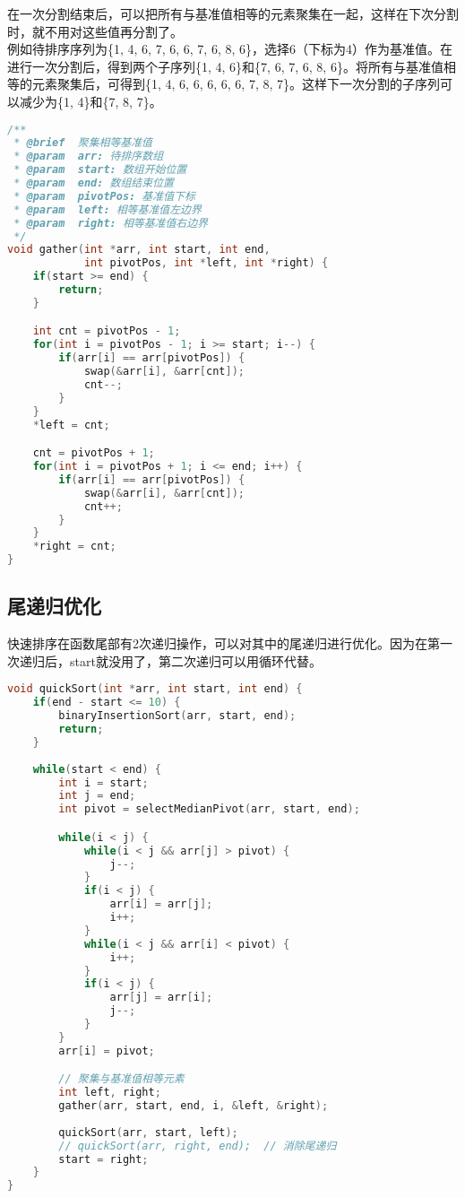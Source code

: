 在一次分割结束后，可以把所有与基准值相等的元素聚集在一起，这样在下次分割时，就不用对这些值再分割了。 \\

例如待排序序列为\{1, 4, 6, 7, 6, 6, 7, 6, 8, 6\}，选择6（下标为4）作为基准值。在进行一次分割后，得到两个子序列\{1, 4, 6\}和\{7, 6, 7, 6, 8, 6\}。将所有与基准值相等的元素聚集后，可得到\{1, 4, 6, 6, 6, 6, 6, 7, 8, 7\}。这样下一次分割的子序列可以减少为\{1, 4\}和\{7, 8, 7\}。 \\


\begin{lstlisting}[language=C]
/**
 * @brief  聚集相等基准值
 * @param  arr: 待排序数组
 * @param  start: 数组开始位置
 * @param  end: 数组结束位置
 * @param  pivotPos: 基准值下标
 * @param  left: 相等基准值左边界
 * @param  right: 相等基准值右边界
 */
void gather(int *arr, int start, int end, 
            int pivotPos, int *left, int *right) {
    if(start >= end) {
        return;
    }

    int cnt = pivotPos - 1;
    for(int i = pivotPos - 1; i >= start; i--) {
        if(arr[i] == arr[pivotPos]) {
            swap(&arr[i], &arr[cnt]);
            cnt--;
        }
    }
    *left = cnt;

    cnt = pivotPos + 1;
    for(int i = pivotPos + 1; i <= end; i++) {
        if(arr[i] == arr[pivotPos]) {
            swap(&arr[i], &arr[cnt]);
            cnt++;
        }
    }
    *right = cnt;
}
\end{lstlisting}

\subsection{尾递归优化}

快速排序在函数尾部有2次递归操作，可以对其中的尾递归进行优化。因为在第一次递归后，start就没用了，第二次递归可以用循环代替。 \\


\begin{lstlisting}[language=C]
void quickSort(int *arr, int start, int end) {
    if(end - start <= 10) {
        binaryInsertionSort(arr, start, end);
        return;
    }
    
    while(start < end) {
        int i = start;
        int j = end;
        int pivot = selectMedianPivot(arr, start, end);

        while(i < j) {
            while(i < j && arr[j] > pivot) {
                j--;
            }
            if(i < j) {
                arr[i] = arr[j];
                i++;
            }
            while(i < j && arr[i] < pivot) {
                i++;
            }
            if(i < j) {
                arr[j] = arr[i];
                j--;
            }
        }
        arr[i] = pivot;

        // 聚集与基准值相等元素
        int left, right;
        gather(arr, start, end, i, &left, &right);
        
        quickSort(arr, start, left);
        // quickSort(arr, right, end);  // 消除尾递归
        start = right;
    }
}
\end{lstlisting}

